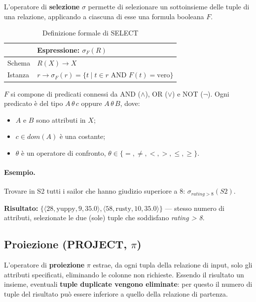\documentclass[12pt, a4paper]{article}
\begin{document}
L'operatore di \textbf{selezione} $\sigma$ permette di selezionare un sottoinsieme delle tuple di una relazione, applicando a ciascuna di esse una formula booleana $F$.

\begin{table}[H]
\centering
\begin{tabular}{@{}ll@{}}
\toprule
& \textbf{Espressione: $\sigma_F(R)$} \\
\midrule
Schema & $R(X) \rightarrow X$ \\
Istanza & $r \rightarrow \sigma_F(r) = \{t \mid t \in r \text{ AND } F(t) = \text{vero}\}$ \\
\bottomrule
\end{tabular}
\caption{Definizione formale di SELECT}
\end{table}

$F$ si compone di predicati connessi da AND ($\wedge$), OR ($\vee$) e NOT ($\neg$). Ogni predicato è del tipo $A \, \theta \, c$ oppure $A \, \theta \, B$, dove:
\begin{itemize}
    \item $A$ e $B$ sono attributi in $X$;
    \item $c \in dom(A)$ è una costante;
    \item $\theta$ è un operatore di confronto, $\theta \in \{=, \neq, <, >, \leq, \geq\}$.
\end{itemize}

\paragraph{Esempio.} Trovare in S2 tutti i sailor che hanno giudizio superiore a 8: $\sigma_{rating > 8}(S2)$.

\textbf{Risultato:} $\{\langle 28,\text{yuppy},9,35.0\rangle, \langle 58,\text{rusty},10,35.0\rangle\}$ — stesso numero di attributi, selezionate le due (sole) tuple che soddisfano \textit{rating > 8}.

\subsection{Proiezione (PROJECT, $\pi$)}

L'operatore di \textbf{proiezione} $\pi$ estrae, da ogni tupla della relazione di input, solo gli attributi specificati, eliminando le colonne non richieste. Essendo il risultato un insieme, eventuali \textbf{tuple duplicate vengono eliminate}: per questo il numero di tuple del risultato può essere inferiore a quello della relazione di partenza.
\end{document}
